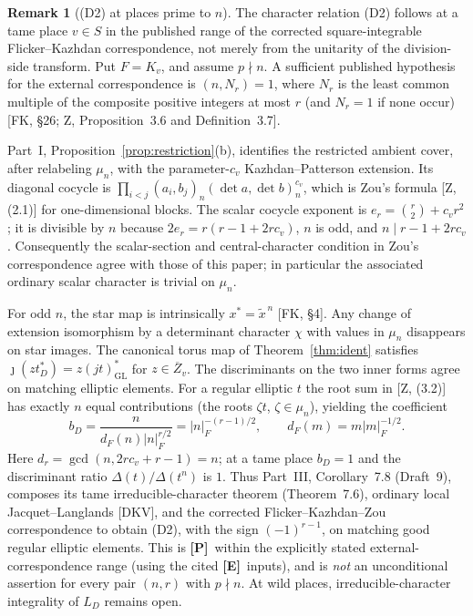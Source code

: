 \documentclass[12pt]{article}
\newcommand{\ov}[1]{\overline{#1}}
\newcommand{\GL}{\mathrm{GL}}
\newcommand{\Zb}{\ov{Z}}
\newcommand{\jj}{\jmath}
\newcommand{\Pv}{\textbf{[P]}}
\newcommand{\Ev}{\textbf{[E]}}
\theoremstyle{plain}
\theoremstyle{definition}
\newtheorem{remark}[theorem]{Remark}
\begin{document}
\begin{remark}[(D2) at places prime to $n$]\label{rem:D2tame}
The character relation (D2) follows at a tame place $v\in S$ in the
published range of the corrected square-integrable Flicker--Kazhdan
correspondence, not merely from the unitarity of the division-side
transform.  Put $F=K_v$, and assume $p\nmid n$.
A sufficient published hypothesis for the external correspondence
is $(n,N_r)=1$, where $N_r$ is the least common multiple of the
composite positive integers at most $r$ (and $N_r=1$ if none occur)
[FK, \S26; Z, Proposition~3.6 and Definition~3.7].

Part~I, Proposition~\ref{prop:restriction}(b), identifies the
restricted ambient cover, after relabeling $\mu_n$, with the
parameter-$c_v$ Kazhdan--Patterson extension.  Its diagonal cocycle
is $\prod_{i<j}(a_i,b_j)_n(\det a,\det b)_n^{c_v}$,
which is Zou's formula [Z, (2.1)] for one-dimensional blocks.
The scalar cocycle exponent is
$e_r=\binom r2+c_vr^2$; it is divisible by $n$ because
$2e_r=r(r-1+2rc_v)$, $n$ is odd, and
$n\mid r-1+2rc_v$.  Consequently the scalar-section and
central-character condition in Zou's correspondence agree with
those of this paper; in particular the associated ordinary scalar
character is trivial on $\mu_n$.

For odd $n$, the star map is intrinsically
$x^*=\tilde x^{\,n}$ [FK, \S4].  Any change of extension
isomorphism by a determinant character $\chi$ with values in
$\mu_n$ disappears on star images.  The canonical torus map of
Theorem~\ref{thm:ident} satisfies
$\jj(z t_D^*)=z(jt)_{\GL}^*$ for $z\in\Zb_v$.
The discriminants on the two inner forms agree on matching
elliptic elements.  For a regular elliptic $t$ the root sum in
[Z, (3.2)] has exactly $n$ equal contributions (the roots
$\zeta t$, $\zeta\in\mu_n$), yielding the coefficient
\[
 b_D=\frac{n}{d_F(n)|n|_F^{r/2}}
     =|n|_F^{-(r-1)/2},\qquad
 d_F(m)=m|m|_F^{-1/2}.
\]
Here $d_r=\gcd(n,2rc_v+r-1)=n$; at a tame place
$b_D=1$ and the discriminant ratio $\Delta(t)/\Delta(t^n)$
is $1$.  Thus Part~III, Corollary~7.8 (Draft~9), composes
its tame irreducible-character theorem (Theorem~7.6),
ordinary local Jacquet--Langlands [DKV], and the corrected
Flicker--Kazhdan--Zou correspondence to obtain (D2), with the
sign $(-1)^{r-1}$, on matching good regular elliptic elements.
This is \Pv\ within the explicitly stated external-correspondence
range (using the cited \Ev\ inputs), and is \emph{not} an
unconditional assertion for every pair $(n,r)$ with $p\nmid n$.
At wild places, irreducible-character integrality of $L_D$
remains open.
\end{remark}
\end{document}
